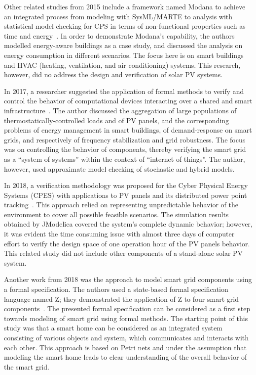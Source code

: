 \documentclass[review]{elsarticle}
\begin{document}
Other related studies from 2015 include a framework named Modana to achieve an integrated process 
from modeling with SysML/MARTE to analysis with statistical model checking for CPS 
in terms of non-functional properties such as time and energy~\cite{Cheng2015}. 
In order to demonstrate Modana's capability, the authors modelled energy-aware buildings 
as a case study, and discussed the analysis on energy consumption in different scenarios. 
The focus here is on smart buildings and HVAC (heating, ventilation, and air conditioning) systems. 
This research, however, did no address the design and verification of solar PV systems. 
 
In 2017, a researcher suggested the application of formal methods to verify and control 
the behavior of computational devices interacting over a shared and smart infrastructure~\cite{Abate2017}. 
The author discussed the aggregation of large populations of thermostatically-controlled loads and of PV panels, 
and the corresponding problems of energy management in smart buildings, of demand-response on smart grids, 
and respectively of frequency stabilization and grid robustness. The focus was on controlling the behavior of components, 
thereby verifying the smart grid as a ``system of systems'' within the context of ``internet of things''. 
The author, however, used approximate model checking of stochastic and hybrid models.

In 2018, a verification methodology was proposed for the Cyber Physical Energy Systems (CPES) 
with applications to PV panels and its distributed power point tracking~\cite{Driouich2018}. 
This approach relied on representing unpredictable behavior of the environment to cover all possible 
feasible scenarios. The simulation results obtained by JModelica covered the system's complete dynamic behavior; 
however, it was evident the time consuming issue with almost three days of computer effort 
to verify the design space of one operation hour of the PV panels behavior. 
This related study did not include other components of a stand-alone solar PV system.

Another work from 2018 was the approach to model smart grid components using a formal specification. 
The authors used a state-based formal specification language named Z; 
they demonstrated the application of Z to four smart grid components~\cite{Akram2018}. 
The presented formal specification can be considered as a first step towards modeling 
of smart grid using formal methods. The starting point of this study was that a smart home 
can be considered as an integrated system consisting of various objects and system, 
which communicates and interacts with each other. This approach is based 
on Petri nets and under the assumption that modeling the smart home 
leads to clear understanding of the overall behavior of the smart grid.
\end{document}
